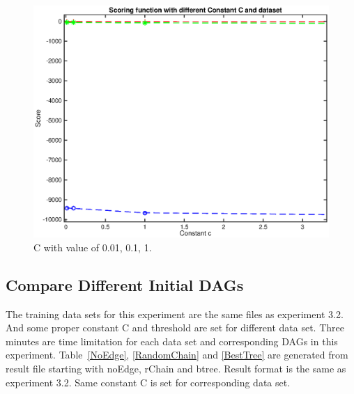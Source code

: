 \documentclass{article}
\begin{document}
\begin{figure}[ht]
\vskip 0.2in
\begin{center}
\centerline{\includegraphics[width=\columnwidth]{constant_compd}}
\caption{C with value of 0.01, 0.1, 1.}
\label{constant_Compd}
\end{center}
\vskip -0.2in
\end{figure} 

\subsection{Compare Different Initial DAGs}
The training data sets for this experiment are the same files as experiment 3.2. And some proper constant C and threshold are set for different data set. Three minutes are time limitation for each data set and corresponding DAGs in this experiment. Table~\ref{NoEdge}, \ref{RandomChain} and \ref{BestTree} are generated from result file starting with noEdge, rChain and btree. Result format is the same as experiment 3.2. Same constant C is set for corresponding data set.
\end{document}
